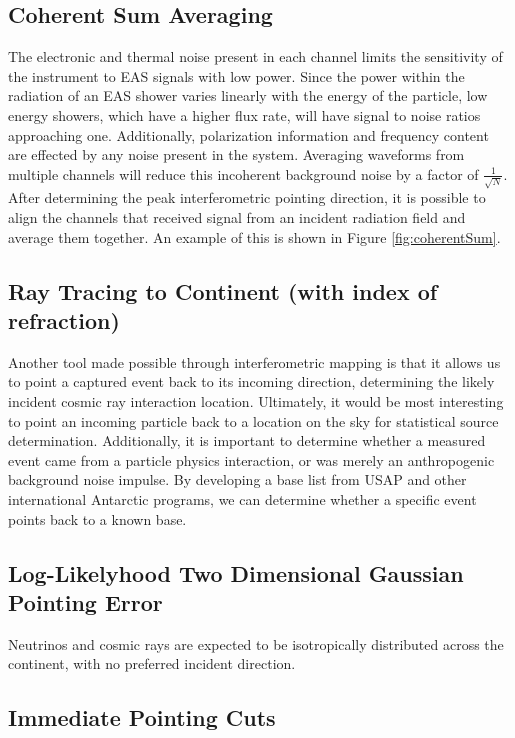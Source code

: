 		
	\subsection{Coherent Sum Averaging}
		The electronic and thermal noise present in each channel limits the sensitivity of the instrument to EAS signals with low power.  Since the power within the radiation of an EAS shower varies linearly with the energy of the particle, low energy showers, which have a higher flux rate, will have signal to noise ratios approaching one.  Additionally, polarization information and frequency content are effected by any noise present in the system.  Averaging waveforms from multiple channels will reduce this incoherent background noise by a factor of $\frac{1}{\sqrt{N}}$.  After determining the peak interferometric pointing direction, it is possible to align the channels that received signal from an incident radiation field and average them together.  An example of this is shown in Figure \ref{fig:coherentSum}.
	
	
	\subsection{Ray Tracing to Continent (with index of refraction)}
		Another tool made possible through interferometric mapping is that it allows us to point a captured event back to its incoming direction, determining the likely incident cosmic ray interaction location.  Ultimately, it would be most interesting to point an incoming particle back to a location on the sky for statistical source determination.  Additionally, it is important to determine whether a measured event came from a particle physics interaction, or was merely an anthropogenic background noise impulse.  By developing a base list from USAP and other international Antarctic programs, we can determine whether a specific event points back to a known base.
		
		
	\subsection{Log-Likelyhood Two Dimensional Gaussian Pointing Error}
		Neutrinos and cosmic rays are expected to be isotropically distributed across the continent, with no preferred incident direction.
	
	\subsection{Immediate Pointing Cuts}


